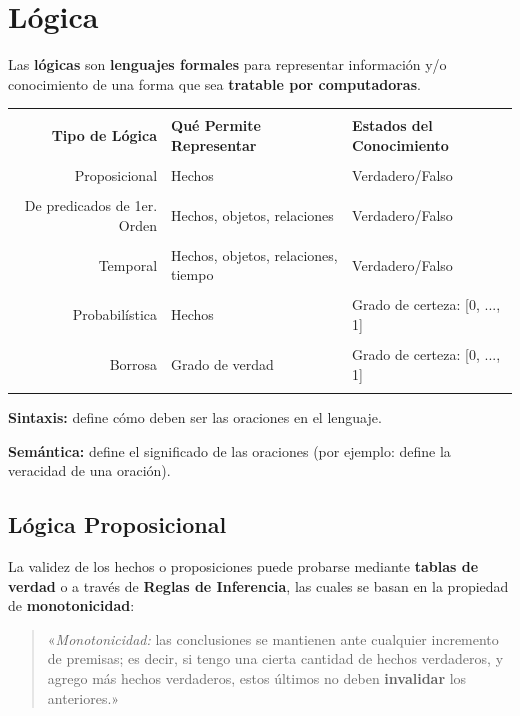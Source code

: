 \documentclass[10pt,a4paper]{article}
\begin{document}
\section{Lógica}
Las \textbf{lógicas} son \textbf{lenguajes formales} para representar información y/o conocimiento de una forma que sea \textbf{tratable por computadoras}.

\begin{tabular}{rll}
\hline \\ [-1.5ex]
{\bf Tipo de Lógica} & {\bf Qué Permite Representar} & {\bf Estados del Conocimiento}\\\hline \\ [-1.5ex]
Proposicional &
Hechos &
Verdadero/Falso
\\ [1ex] \hline \\ [-1.5ex]
De predicados de 1er. Orden &
Hechos, objetos, relaciones &
Verdadero/Falso
\\ [1ex] \hline \\ [-1.5ex]
Temporal &
Hechos, objetos, relaciones, tiempo &
Verdadero/Falso
\\ [1ex] \hline \\ [-1.5ex]
Probabilística &
Hechos &
Grado de certeza: [0, ..., 1]
\\ [1ex] \hline \\ [-1.5ex]
Borrosa &
Grado de verdad &
Grado de certeza: [0, ..., 1]
\\ [1ex] \hline \\ [-1.5ex]
\end{tabular}

\begin{description}
\item \textbf{Sintaxis:} define cómo deben ser las oraciones en el lenguaje.
\item \textbf{Semántica:} define el significado de las oraciones (por ejemplo: define la veracidad de una oración).
\end{description}

\subsection{Lógica Proposicional}

La validez de los hechos o proposiciones puede probarse mediante \textbf{tablas de verdad} o a través de \textbf{Reglas de Inferencia}, las cuales se basan en la propiedad de \textbf{monotonicidad}: 
\begin{quote}
«\textit{Monotonicidad:} las conclusiones se mantienen ante cualquier incremento de premisas; es decir, si tengo una cierta cantidad de hechos verdaderos, y agrego más hechos verdaderos, estos últimos no deben \textbf{invalidar} los anteriores.»
\end{quote}
\end{document}
